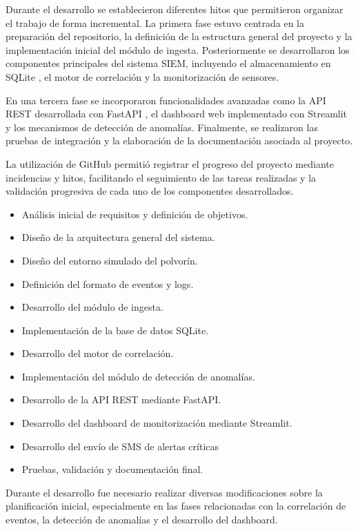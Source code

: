 Durante el desarrollo se establecieron diferentes hitos que permitieron organizar el trabajo de forma incremental. La primera fase estuvo centrada en la preparación del repositorio, la definición de la estructura general del proyecto y la implementación inicial del módulo de ingesta. Posteriormente se desarrollaron los componentes principales del sistema SIEM, incluyendo el almacenamiento en SQLite \cite{sqlite}, el motor de correlación y la monitorización de sensores.

En una tercera fase se incorporaron funcionalidades avanzadas como la API REST desarrollada con FastAPI \cite{fastapi}, el dashboard web implementado con Streamlit \cite{streamlit} y los mecanismos de detección de anomalías. Finalmente, se realizaron las pruebas de integración y la elaboración de la documentación asociada al proyecto.

La utilización de GitHub permitió registrar el progreso del proyecto mediante incidencias y hitos, facilitando el seguimiento de las tareas realizadas y la validación progresiva de cada uno de los componentes desarrollados.


\begin{itemize}
\item Análisis inicial de requisitos y definición de objetivos.
\item Diseño de la arquitectura general del sistema.
\item Diseño del entorno simulado del polvorín.
\item Definición del formato de eventos y logs.
\item Desarrollo del módulo de ingesta.
\item Implementación de la base de datos SQLite.
\item Desarrollo del motor de correlación.
\item Implementación del módulo de detección de anomalías.
\item Desarrollo de la API REST mediante FastAPI.
\item Desarrollo del dashboard de monitorización mediante Streamlit.
\item Desarrollo del envío de SMS de alertas críticas
\item Pruebas, validación y documentación final.
\end{itemize}

Durante el desarrollo fue necesario realizar diversas modificaciones sobre la planificación inicial, especialmente en las fases relacionadas con la correlación de eventos, la detección de anomalías y el desarrollo del dashboard.

